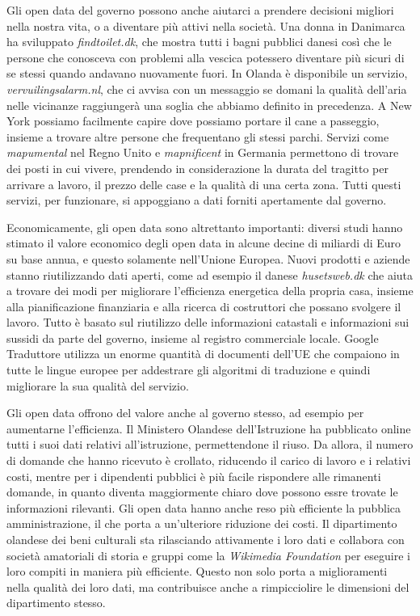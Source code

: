 Gli open data del governo possono anche aiutarci a prendere decisioni migliori nella nostra vita, o a diventare più attivi nella società. Una donna in Danimarca ha sviluppato \textit{findtoilet.dk}, che mostra tutti i bagni pubblici danesi così che le persone che conosceva con problemi alla vescica potessero diventare più sicuri di se stessi quando andavano nuovamente fuori. In Olanda è disponibile un servizio, \textit{vervuilingsalarm.nl}, che ci avvisa con un messaggio se domani la qualità dell'aria nelle vicinanze raggiungerà una soglia che abbiamo definito in precedenza. A New York possiamo facilmente capire dove possiamo portare il cane a passeggio, insieme a trovare altre persone che frequentano gli stessi parchi. Servizi come \textit{mapumental} nel Regno Unito e \textit{mapnificent} in Germania permettono di trovare dei posti in cui vivere, prendendo in considerazione la durata del tragitto per arrivare a lavoro, il prezzo delle case e la qualità di una certa zona. Tutti questi servizi, per funzionare, si appoggiano a dati forniti apertamente dal governo.

Economicamente, gli open data sono altrettanto importanti: diversi studi hanno stimato il valore economico degli open data in alcune decine di miliardi di Euro su base annua, e questo solamente nell'Unione Europea. Nuovi prodotti e aziende stanno riutilizzando dati aperti, come ad esempio il danese \textit{husetsweb.dk} che aiuta a trovare dei modi per migliorare l'efficienza energetica della propria casa, insieme alla pianificazione finanziaria e alla ricerca di costruttori che possano svolgere il lavoro. Tutto è basato sul riutilizzo delle informazioni catastali e informazioni sui sussidi da parte del governo, insieme al registro commerciale locale. Google Traduttore utilizza un enorme quantità di documenti dell'UE che compaiono in tutte le lingue europee per addestrare gli algoritmi di traduzione e quindi migliorare la sua qualità del servizio.

Gli open data offrono del valore anche al governo stesso, ad esempio per aumentarne l'efficienza. Il Ministero Olandese dell'Istruzione ha pubblicato online tutti i suoi dati relativi all'istruzione, permettendone il riuso. Da allora, il numero di domande che hanno ricevuto è crollato, riducendo il carico di lavoro e i relativi costi, mentre per i dipendenti pubblici è più facile rispondere alle rimanenti domande, in quanto diventa maggiormente chiaro dove possono essre trovate le informazioni rilevanti. Gli open data hanno anche reso più efficiente la pubblica amministrazione, il che porta a un'ulteriore riduzione dei costi. Il dipartimento olandese dei beni culturali sta rilasciando attivamente i loro dati e collabora con società amatoriali di storia e gruppi come la \textit{Wikimedia Foundation} per eseguire i loro compiti in maniera più efficiente. Questo non solo porta a miglioramenti nella qualità dei loro dati, ma contribuisce anche a rimpicciolire le dimensioni del dipartimento stesso.

